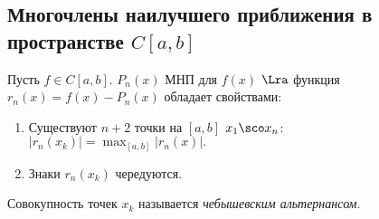 \documentclass{article}
\begin{document}
\subsection{Многочлены наилучшего приближения в пространстве $C[a,b]$}
\begin{theorem}[Чебышев]
Пусть $f\in C[a,b]$. $P_n(x)$ МНП для $f(x)$ $\Lra$
функция $r_n(x)=f(x)-P_n(x)$ обладает свойствами:
\begin{enumerate}
\item
Существуют $n+2$ точки на $[a,b]$ $x_1\sco x_n$:
$|r_n(x_k)|=\max_{[a,b]}|r_n(x)|.$
\item
Знаки $r_n(x_k)$ чередуются.
\end{enumerate}
\end{theorem}
\begin{df}
  Совокупность точек $x_k$ называется \emph{чебышевским альтернансом}.
\end{df}
\end{document}
